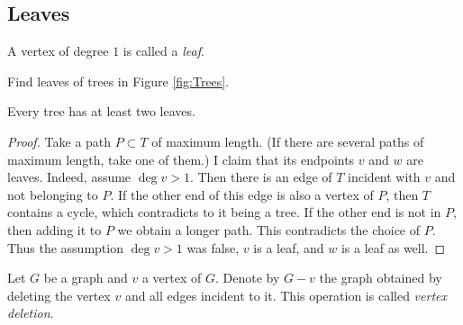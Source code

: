 \begin{page}

\subsection{Leaves}

\end{page}

\begin{page}

\begin{dfn}
A vertex of degree $1$ is called a \emph{leaf}.
\end{dfn}

\end{page}

\begin{page}


Find leaves of trees in Figure \ref{fig:Trees}.


\end{page}

\begin{page}

\begin{lem}
\label{lem:LeafTree}
Every tree has at least two leaves.
\end{lem}

\end{page}

\begin{page}

\begin{proof}
Take a path $P \subset T$ of maximum length.
(If there are several paths of maximum length, take one of them.)
I claim that its endpoints $v$ and $w$ are leaves.
Indeed, assume $\deg v > 1$.
Then there is an edge of $T$ incident with $v$ and not belonging to $P$.
If the other end of this edge is also a vertex of $P$, then $T$ contains a cycle, which contradicts to it being a tree.
If the other end is not in $P$, then adding it to $P$ we obtain a longer path.
This contradicts the choice of $P$.
Thus the assumption $\deg v > 1$ was false, $v$ is a leaf, and $w$ is a leaf as well.
\end{proof}


\end{page}

\begin{page}

\begin{dfn}
Let $G$ be a graph and $v$ a vertex of $G$.
Denote by $G - v$ the graph obtained by deleting the vertex $v$ and all edges incident to it.
This operation is called \emph{vertex deletion}.
\end{dfn}

\end{page}

